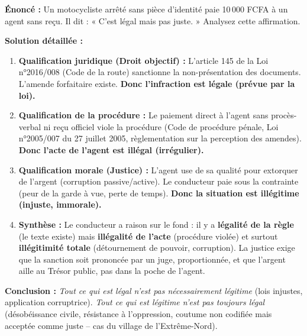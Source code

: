 \documentclass[11pt]{article}
\newcommand{\cle}[1]{{\popxbold\color{popdark}#1}}
\begin{document}
\begin{exoresolu}
\textbf{Énoncé :} Un motocycliste arrêté sans pièce d'identité paie 10\,000 FCFA à un agent sans reçu. Il dit : « C'est légal mais pas juste. » Analysez cette affirmation.

\textbf{Solution détaillée :}
\begin{enumerate}
\item \textbf{Qualification juridique (Droit objectif) :} L'article 145 de la Loi n°2016/008 (Code de la route) sanctionne la non-présentation des documents. L'amende forfaitaire existe. \textbf{Donc l'infraction est légale (prévue par la loi).}
\item \textbf{Qualification de la procédure :} Le paiement direct à l'agent sans procès-verbal ni reçu officiel viole la procédure (Code de procédure pénale, Loi n°2005/007 du 27 juillet 2005, règlementation sur la perception des amendes). \textbf{Donc l'acte de l'agent est illégal (irrégulier).}
\item \textbf{Qualification morale (Justice) :} L'agent use de sa qualité pour extorquer de l'argent (corruption passive/active). Le conducteur paie sous la contrainte (peur de la garde à vue, perte de temps). \textbf{Donc la situation est illégitime (injuste, immorale).}
\item \textbf{Synthèse :} Le conducteur a raison sur le fond : il y a \textbf{légalité de la règle} (le texte existe) mais \textbf{illégalité de l'acte} (procédure violée) et surtout \textbf{illégitimité totale} (détournement de pouvoir, corruption). La \cle{justice} exige que la sanction soit prononcée par un juge, proportionnée, et que l'argent aille au Trésor public, pas dans la poche de l'agent.
\end{enumerate}
\textbf{Conclusion :} \emph{Tout ce qui est légal n'est pas nécessairement légitime} (lois injustes, application corruptrice). \emph{Tout ce qui est légitime n'est pas toujours légal} (désobéissance civile, résistance à l'oppression, coutume non codifiée mais acceptée comme juste -- cas du village de l'Extrême-Nord).
\end{exoresolu}
\end{document}
